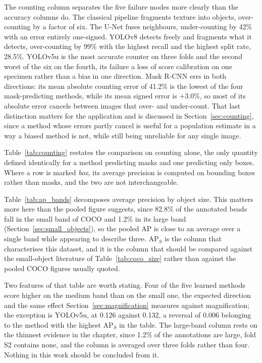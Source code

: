 The counting column separates the five failure modes more clearly than the
accuracy columns do. The classical pipeline fragments texture into objects,
over-counting by a factor of six. The U-Net fuses neighbours, under-counting by
42\% with an error entirely one-signed. YOLOv8 detects freely and fragments what
it detects, over-counting by 99\% with the highest recall and the highest split
rate, 28.5\%. YOLOv5u is the most accurate counter on three folds and the second
worst of the six on the fourth, its failure a loss of score calibration on one
specimen rather than a bias in one direction. Mask R-CNN errs in both directions:
its mean absolute counting error of 41.2\% is the lowest of the four
mask-predicting methods, while its mean signed error is $+3.0\%$, so most of its
absolute error cancels between images that over- and under-count. That last
distinction matters for the application and is discussed in
Section~\ref{sec:counting}, since a method whose errors partly cancel is useful
for a population estimate in a way a biased method is not, while still being
unreliable for any single image.

Table~\ref{tab:counting} restates the comparison on counting alone, the only
quantity defined identically for a method predicting masks and one predicting
only boxes. Where a row is marked \emph{box}, its average precision is computed on
bounding boxes rather than masks, and the two are not interchangeable.



Table~\ref{tab:ap_bands} decomposes average precision by object size. This matters
more here than the pooled figure suggests, since 82.8\% of the annotated beads
fall in the small band of COCO and 1.2\% in its large band
(Section~\ref{sec:small_objects}), so the pooled AP is close to an average over
a single band while appearing to describe three. $\mathrm{AP}_S$ is the column that
characterises this dataset, and it is the column that should be compared against the
small-object literature of Table~\ref{tab:coco_size} rather than against the pooled
COCO figures usually quoted.



Two features of that table are worth stating. Four of the five learned methods
score higher on the medium band than on the small one, the expected direction and
the same effect Section~\ref{sec:magnification} measures against magnification;
the exception is YOLOv5u, at 0.126 against 0.132, a reversal of 0.006 belonging to
the method with the highest $\mathrm{AP}_S$ in the table. The large-band column
rests on the thinnest evidence in the chapter, since 1.2\% of the annotations are
large, fold S2 contains none, and the column is averaged over three folds rather
than four. Nothing in this work should be concluded from it.

